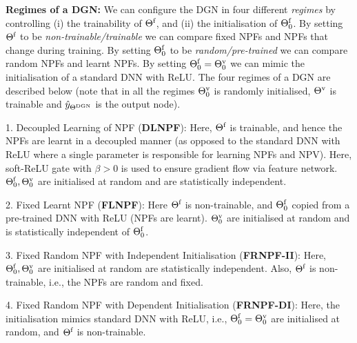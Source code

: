\documentclass{article}
\begin{document}
\textbf{Regimes of a DGN:} We can configure the DGN in four different \emph{regimes} by controlling (i)  the trainability of $\Theta^{\textrm{f}}$, and (ii) the initialisation of $\Theta^{\textrm{f}}_0$. By setting $\Theta^{\textrm{f}}$ to be \emph{non-trainable/trainable} we can compare fixed NPFs and NPFs that change during training. By setting $\Theta^{\textrm{f}}_0$ to be \emph{random/pre-trained} we can compare random NPFs and learnt NPFs. By setting $\Theta^{\textrm{f}}_0={\Theta}^{\text{v}}_0$ we can mimic the initialisation of a standard DNN with ReLU. The four regimes of a DGN are described below (note that in all the regimes ${\Theta}^{\text{v}}_0$ is randomly initialised,  ${\Theta}^{\text{v}}$ is trainable and $\hat{y}_{\Theta^{\text{DGN}}}$ is the output node).

1. Decoupled Learning of NPF (\textbf{DLNPF}): Here, $\Theta^{\textrm{f}}$ is trainable, and hence the NPFs are learnt in a decoupled manner (as opposed to the standard DNN with ReLU where a single parameter is responsible for learning NPFs and NPV). Here, soft-ReLU gate with $\beta>0$ is used to ensure gradient flow via feature network. $\Theta^{\textrm{f}}_0,{\Theta}^{\text{v}}_0$ are initialised at random and are statistically independent.

2. Fixed Learnt NPF (\textbf{FLNPF}): Here $\Theta^{\textrm{f}}$ is non-trainable, and $\Theta^{\textrm{f}}_0$ copied from a  pre-trained DNN with ReLU (NPFs are learnt). ${\Theta}^{\text{v}}_0$ are initialised at random and is statistically independent of $\Theta^{\textrm{f}}_0$.

3. Fixed Random NPF with Independent Initialisation (\textbf{FRNPF-II}): Here,  $\Theta^{\textrm{f}}_0,{\Theta}^{\text{v}}_0$ are initialised at random are statistically independent. Also, $\Theta^{\textrm{f}}$ is non-trainable, i.e.,  the NPFs are random and fixed.

4. Fixed Random NPF with Dependent Initialisation (\textbf{FRNPF-DI}):  Here, the initialisation mimics standard DNN with ReLU, i.e., $\Theta^{\textrm{f}}_0={\Theta}^{\text{v}}_0$ are initialised at random, and $\Theta^{\textrm{f}}$ is non-trainable.
\end{document}
